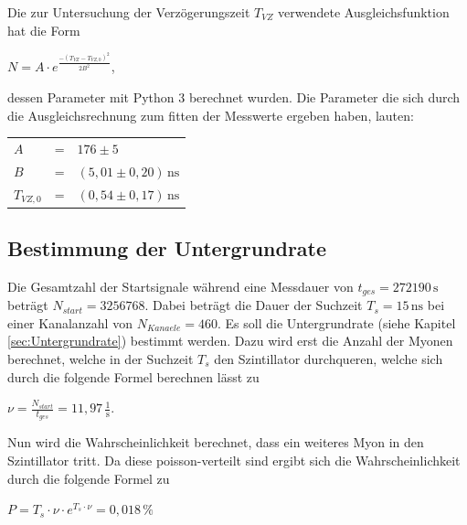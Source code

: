 \newpage

\noindent Die zur Untersuchung der Verzögerungszeit $T_{VZ}$ verwendete Ausgleichsfunktion hat die Form

\begin{center}
$N = A \cdot e^{\frac{-(T_{VZ}-T_{VZ,0})^2}{2B^2}}$,
\end{center}

\noindent dessen Parameter mit Python 3 berechnet wurden. Die Parameter die sich durch die Ausgleichsrechnung zum fitten der Messwerte ergeben haben, lauten:

\begin{table}[H]
\centering
\begin{tabular}{lll}
$A$        &=& $176  \pm 5$    \\
$B$        &=& $(5,01 \pm 0,20)\,\mathrm{ns}$ \\
$T_{VZ,0}$ &=& $(0,54 \pm 0,17)\,\mathrm{ns}$ \\
\end{tabular}
\end{table}

\subsection{Bestimmung der Untergrundrate}
\label{subsec:2}

\noindent Die Gesamtzahl der Startsignale während eine Messdauer von $t_{ges}=272190\,\mathrm{s}$ beträgt $N_{start}=3256768$. Dabei beträgt die Dauer der Suchzeit $T_{s}=15\,\mathrm{ns}$ bei einer Kanalanzahl von $N_{Kanaele}=460$. \newline
\noindent Es soll die Untergrundrate (siehe Kapitel \ref{sec:Untergrundrate}) bestimmt werden. Dazu wird erst die Anzahl der Myonen berechnet, welche in der Suchzeit $T_{s}$ den Szintillator durchqueren, welche sich durch die folgende Formel berechnen lässt zu

\begin{center}
$\nu = \frac{N_{start}}{t_{ges}}=11,97\,\mathrm{\frac{1}{s}} .$
\end{center}

\noindent Nun wird die Wahrscheinlichkeit berechnet, dass ein weiteres Myon in den Szintillator tritt. Da diese poisson-verteilt sind ergibt sich die Wahrscheinlichkeit durch die folgende Formel zu

\begin{center}
$P = T_{s}\cdot \nu \cdot e^{T_{s} \cdot \nu} = 0,018\,\mathrm{\%} $
\end{center} 

